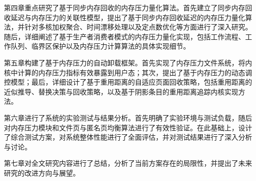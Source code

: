 第四章重点研究了基于同步内存回收的内存压力量化算法。首先建立了同步内存回收延迟与内存压力的关联性模型，提出了基于同步内存回收延迟的内存压力量化算法，并针对多核加权聚合、时间漂移处理以及定点数优化等方面进行了深入研究。随后，详细阐述了基于生产者消费者模式的内存压力量化实现，包括工作流程、工作队列、临界区保护以及内存压力计算算法的具体实现细节。

第五章构建了基于内存压力的自动卸载框架。首先实现了内存压力文件系统，将内核中计算的内存压力指标有效暴露到用户态；其次，提出了基于内存压力的动态调控模型；最后，详细设计了基于重用距离的自适应页面回收策略，包括重用距离的近似推导、替换决策与回收策略，以及基于阴影条目的重用距离追踪内核实现方法。

第六章进行了系统的实验测试与结果分析。首先明确了实验环境与测试负载，随后对内存压力模块和文件页与匿名页均衡算法进行了有效性验证。在此基础上，设计了综合测试方案，对系统整体性能进行了全面评估，并对测试结果进行了深入分析与讨论。

第七章对全文研究内容进行了总结，分析了当前方案存在的局限性，并提出了未来研究的改进方向与展望。


